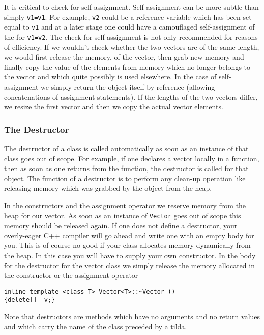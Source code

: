 It is critical to check for self-assignment. Self-assignment can be
more subtle than simply \verb+v1=v1+. For example, \verb+v2+ could be a
reference variable which has been set equal to \verb+v1+ and at a later
stage one could have a camouflaged self-assignment of the for \verb+v1=v2+.
The check for self-assignment is not only recommended for reasons of efficiency.
If we wouldn't check whether the two vectors are of the same length, we would
first release the memory, of the vector, then grab new memory and finally copy
the value of the elements from memory which no longer belongs to the vector
and which quite possibly is used elsewhere. In the case of self-assignment
we simply return the object itself by reference (allowing concatenations
of assignment statements). If the lengths of the two vectors differ, we resize the
first vector and then we copy the actual vector elements.



\subsubsection{The Destructor}

The destructor of a class is called automatically as soon as an instance
of that class goes out of scope. For example, if one declares a vector
locally in a function, then as soon as one returns from the function,
the destructor is called for that object. The function of a destructor is to
perform any clean-up operation like releasing memory which was
grabbed by the object from the heap.

In the constructors and the assignment operator
we reserve memory from the heap for our vector.
As soon as an instance of \verb+Vector+ goes out of scope this
memory should be released again. If one does not define a destructor,
your overly-eager C++ compiler will go ahead and write one with an
empty body for you. This is of course no good if your class allocates
memory dynamically from the heap. In this case you will have to supply
your own constructor. In the body for the destructor for the vector class
we simply release the memory allocated in the constructor or the
assignment operator
{\footnotesize \begin{verbatim}
inline template <class T> Vector<T>::~Vector ()
{delete[] _v;}
\end{verbatim}}

Note that destructors are methods which have no arguments and
no return values and which carry the name of the class
preceded by a tilda.

